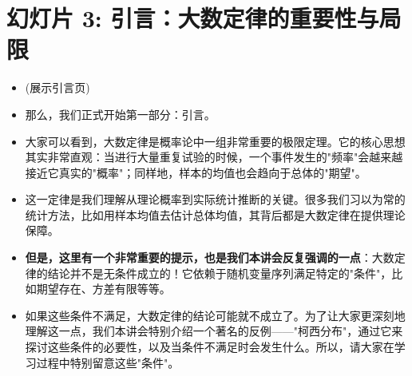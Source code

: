 \documentclass[UTF8]{article} %
\begin{document}
\section*{幻灯片 3: 引言：大数定律的重要性与局限}
\begin{itemize}
    \itemsep1em
    \item (展示引言页)
    \item 那么，我们正式开始第一部分：引言。
    \item 大家可以看到，大数定律是概率论中一组非常重要的极限定理。它的核心思想其实非常直观：当进行大量重复试验的时候，一个事件发生的"频率"会越来越接近它真实的"概率"；同样地，样本的均值也会趋向于总体的"期望"。
    \item 这一定律是我们理解从理论概率到实际统计推断的关键。很多我们习以为常的统计方法，比如用样本均值去估计总体均值，其背后都是大数定律在提供理论保障。
    \item \textbf{但是，这里有一个非常重要的提示，也是我们本讲会反复强调的一点}：大数定律的结论并不是无条件成立的！它依赖于随机变量序列满足特定的"条件"，比如期望存在、方差有限等等。
    \item 如果这些条件不满足，大数定律的结论可能就不成立了。为了让大家更深刻地理解这一点，我们本讲会特别介绍一个著名的反例——"柯西分布"，通过它来探讨这些条件的必要性，以及当条件不满足时会发生什么。所以，请大家在学习过程中特别留意这些"条件"。
\end{itemize}
\end{document}

